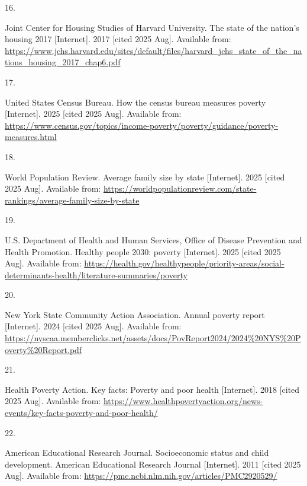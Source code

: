 \documentclass[
  english,
  letterpaper,
]{report}
\newlength{\cslhangindent}
\newlength{\csllabelwidth}
\newenvironment{CSLReferences}[2] %
 {\begin{list}{}{%
  \setlength{\itemindent}{0pt}
  \setlength{\leftmargin}{0pt}
  \setlength{\parsep}{0pt}
  \ifodd #1
   \setlength{\leftmargin}{\cslhangindent}
   \setlength{\itemindent}{-1\cslhangindent}
  \fi
  \setlength{\itemsep}{#2\baselineskip}}}
 {\end{list}}
\newcommand{\CSLLeftMargin}[1]{\parbox[t]{\csllabelwidth}{\strut#1\strut}}
\newcommand{\CSLRightInline}[1]{\parbox[t]{\linewidth - \csllabelwidth}{\strut#1\strut}}
\begin{document}
\begin{CSLReferences}{0}{1}
\CSLLeftMargin{16. }%
\CSLRightInline{Joint Center for Housing Studies of Harvard University.
The state of the nation's housing 2017 {[}Internet{]}. 2017 {[}cited
2025 Aug{]}. Available from:
\url{https://www.jchs.harvard.edu/sites/default/files/harvard_jchs_state_of_the_nations_housing_2017_chap6.pdf}}

\CSLLeftMargin{17. }%
\CSLRightInline{United States Census Bureau. How the census bureau
measures poverty {[}Internet{]}. 2025 {[}cited 2025 Aug{]}. Available
from:
\url{https://www.census.gov/topics/income-poverty/poverty/guidance/poverty-measures.html}}

\CSLLeftMargin{18. }%
\CSLRightInline{World Population Review. Average family size by state
{[}Internet{]}. 2025 {[}cited 2025 Aug{]}. Available from:
\url{https://worldpopulationreview.com/state-rankings/average-family-size-by-state}}

\CSLLeftMargin{19. }%
\CSLRightInline{U.S. Department of Health and Human Services, Office of
Disease Prevention and Health Promotion. Healthy people 2030: poverty
{[}Internet{]}. 2025 {[}cited 2025 Aug{]}. Available from:
\url{https://health.gov/healthypeople/priority-areas/social-determinants-health/literature-summaries/poverty}}

\CSLLeftMargin{20. }%
\CSLRightInline{New York State Community Action Association. Annual
poverty report {[}Internet{]}. 2024 {[}cited 2025 Aug{]}. Available
from:
\url{https://nyscaa.memberclicks.net/assets/docs/PovReport2024/2024\%20NYS\%20Poverty\%20Report.pdf}}

\CSLLeftMargin{21. }%
\CSLRightInline{Health Poverty Action. Key facts: Poverty and poor
health {[}Internet{]}. 2018 {[}cited 2025 Aug{]}. Available from:
\url{https://www.healthpovertyaction.org/news-events/key-facts-poverty-and-poor-health/}}

\CSLLeftMargin{22. }%
\CSLRightInline{American Educational Research Journal. Socioeconomic
status and child development. American Educational Research Journal
{[}Internet{]}. 2011 {[}cited 2025 Aug{]}. Available from:
\url{https://pmc.ncbi.nlm.nih.gov/articles/PMC2920529/}}


\end{CSLReferences}
\end{document}
